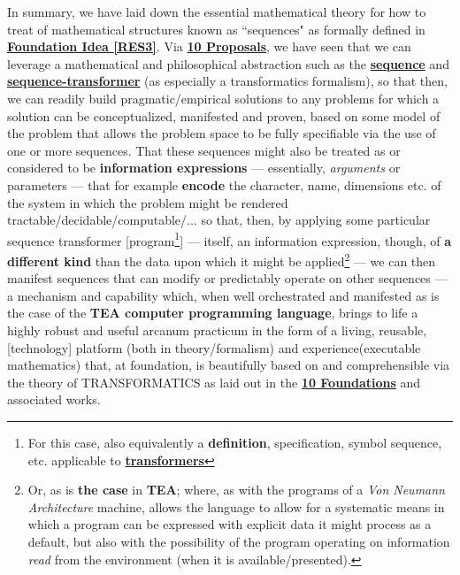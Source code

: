 \documentclass[a4paper, 18pt]{book} %
\begin{document}
In summary, we have laid down the essential mathematical theory for how to treat of mathematical structures known as ``sequences" as formally defined in \textbf{\hyperref[RES3]{Foundation Idea \ref{RES3}}}. Via \textbf{\hyperref[SECPROP]{10 Proposals}}, we have seen that we can leverage a mathematical and philosophical abstraction such as the \textbf{\hyperref[RES3]{sequence}} and \textbf{\hyperref[RES7]{sequence-transformer}} (as especially a transformatics formalism), so that then, we can readily build pragmatic/empirical solutions to any problems for which a solution can be conceptualized, manifested and proven, based on some model of the problem that allows the problem space to be fully specifiable via the use of one or more sequences. That these sequences might also be treated as or considered to be \textbf{information expressions}\cite{lnspaper} --- essentially, \textit{arguments} or parameters --- that for example \textbf{encode} the character, name, dimensions etc. of the system in which the problem might be rendered tractable/decidable/computable/... so that, then, by applying some particular sequence transformer [program\footnote{For this case, also equivalently a \textbf{definition}, specification, symbol sequence, etc. applicable to \textbf{\hyperref[RES7]{transformers}}}] --- itself, an information expression, though, of \textbf{a different kind} than the data upon which it might be applied\footnote{Or, as is \textbf{the case} in \textbf{TEA}; where, as with the programs of a \textit{Von Neumann Architecture} machine, allows the language to allow for a systematic means in which a program can be expressed with explicit data it might process as a default, but also with the possibility of the program operating on information \textit{read} from the environment (when it is available/presented).} --- we can then manifest sequences that can modify or predictably operate on other sequences --- a mechanism and capability which, when well orchestrated and manifested as is the case of the \textbf{TEA computer programming language}\cite{Lutalo2024TEATAZ}, brings to life a highly robust and useful arcanum practicum in the form of a living, reusable, [technology] platform (both in theory/formalism) and experience(executable mathematics) that, at foundation, is beautifully based on and comprehensible via the theory of TRANSFORMATICS as laid out in the \textbf{\hyperref[SECFOUND]{10 Foundations}} and associated works.

%
%
\end{document}
